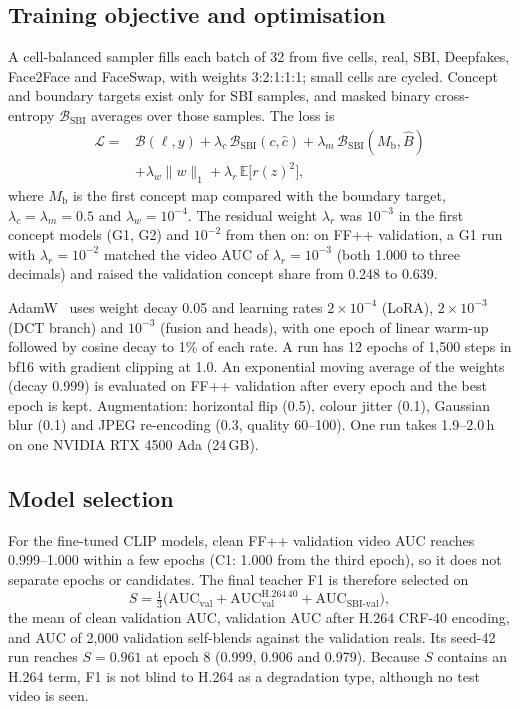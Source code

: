 \documentclass[conference]{IEEEtran}
\begin{document}
\subsection{Training objective and optimisation}\label{sec:objective}
A cell-balanced sampler fills each batch of 32 from five cells, real, SBI, Deepfakes, Face2Face and FaceSwap, with
weights 3:2:1:1:1; small cells are cycled. Concept and boundary targets exist only for SBI samples, and masked
binary cross-entropy $\mathcal{B}_{\mathrm{SBI}}$ averages over those samples. The loss is
\begin{align}
\mathcal{L} = {} & \mathcal{B}(\ell, y) + \lambda_c\,\mathcal{B}_{\mathrm{SBI}}(c,\hat c)
+ \lambda_m\,\mathcal{B}_{\mathrm{SBI}}(M_{\mathrm{b}},\hat B) \nonumber\\
& + \lambda_w \|w\|_1 + \lambda_r\, \mathbb{E}\bigl[r(z)^2\bigr],
\label{eq:loss}
\end{align}
where $M_{\mathrm{b}}$ is the first concept map compared with the boundary target, $\lambda_c=\lambda_m=0.5$ and
$\lambda_w=10^{-4}$. The residual weight $\lambda_r$ was $10^{-3}$ in the first concept models (G1, G2) and
$10^{-2}$ from then on: on FF++ validation, a G1 run with $\lambda_r=10^{-2}$ matched the video AUC of
$\lambda_r=10^{-3}$ (both 1.000 to three decimals) and raised the validation concept share from 0.248 to 0.639.

AdamW~\cite{adamw} uses weight decay 0.05 and learning rates $2\times10^{-4}$ (LoRA), $2\times10^{-3}$ (DCT branch)
and $10^{-3}$ (fusion and heads), with one epoch of linear warm-up followed by cosine decay to 1\% of each rate. A
run has 12 epochs of 1,500 steps in bf16 with gradient clipping at 1.0. An exponential moving average of the
weights (decay 0.999) is evaluated on FF++ validation after every epoch and the best epoch is kept. Augmentation:
horizontal flip (0.5), colour jitter (0.1), Gaussian blur (0.1) and JPEG re-encoding (0.3, quality 60--100). One run
takes 1.9--2.0\,h on one NVIDIA RTX 4500 Ada (24\,GB).

\subsection{Model selection}\label{sec:select}
For the fine-tuned CLIP models, clean FF++ validation video AUC reaches 0.999--1.000 within a few epochs (C1: 1.000
from the third epoch), so it does not separate epochs or candidates. The final teacher F1 is therefore selected on
\begin{equation}
S = \tfrac{1}{3}\bigl(\mathrm{AUC}_{\mathrm{val}} + \mathrm{AUC}_{\mathrm{val}}^{\mathrm{H.264\,40}} +
\mathrm{AUC}_{\mathrm{SBI\text{-}val}}\bigr),
\end{equation}
the mean of clean validation AUC, validation AUC after H.264 CRF-40 encoding, and AUC of 2,000 validation
self-blends against the validation reals. Its seed-42 run reaches $S=0.961$ at epoch 8 (0.999, 0.906 and 0.979).
Because $S$ contains an H.264 term, F1 is not blind to H.264 as a degradation type, although no test video is
seen.
\end{document}
